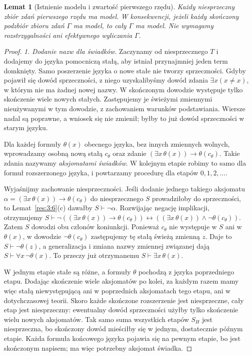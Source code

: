 \documentclass[11pt,a4paper]{article}
\numberwithin{equation}{section}
\theoremstyle{plain}
\newtheorem{lemat}[twierdzenie]{Lemat}
\theoremstyle{definition}
\theoremstyle{remark}
\begin{document}
\begin{lemat}[Istnienie modelu i zwartość pierwszego rzędu]\label{res:14:7}
Każdy niesprzeczny zbiór zdań pierwszego rzędu ma model. W konsekwencji, jeżeli każdy skończony podzbiór zbioru zdań $\Gamma$ ma model, to cały $\Gamma$ ma model. Nie wymagamy rozstrzygalności ani efektywnego wyliczania $\Gamma$.
\end{lemat}
\begin{proof}
\emph{1. Dodanie nazw dla świadków.} Zaczynamy od niesprzecznego $T$ i dodajemy do języka pomocniczą stałą, aby istniał przynajmniej jeden term domknięty. Samo poszerzenie języka o nowe stałe nie tworzy sprzeczności. Gdyby pojawił się dowód sprzeczności, z niego uzyskalibyśmy dowód zdania $\exists x(x\ne x)$, w którym nie ma żadnej nowej nazwy. W skończonym dowodzie występuje tylko skończenie wiele nowych stałych. Zastępujemy je świeżymi zmiennymi nieużywanymi w tym dowodzie, z zachowaniem warunków podstawiania. Wiersze nadal są poprawne, a wniosek się nie zmienił; byłby to już dowód sprzeczności w starym języku.

Dla każdej formuły $\theta(x)$ obecnego języka, bez innych zmiennych wolnych, wprowadzamy osobną nową stałą $c_\theta$ oraz zdanie $(\exists x\,\theta(x))\to\theta(c_\theta)$. Takie zdania nazywamy \emph{aksjomatami świadków}. W kolejnym etapie robimy to samo dla formuł rozszerzonego języka, i powtarzamy procedurę dla etapów $0,1,2,\ldots$.

Wyjaśnijmy zachowanie niesprzeczności. Jeśli dodanie jednego takiego aksjomatu $\alpha=(\exists x\,\theta(x))\to\theta(c_\theta)$ do niesprzecznego $S$ prowadziłoby do sprzeczności, to Lemat~\ref{res:3:6}(c) dawałby $S\vdash\neg\alpha$. Rozwijając negację implikacji, otrzymujemy $S\vdash\neg((\exists x\,\theta(x))\to\theta(c_\theta))\leftrightarrow((\exists x\,\theta(x))\land\neg\theta(c_\theta))$. Zatem $S$ dowodzi obu członów koniunkcji. Ponieważ $c_\theta$ nie występuje w $S$ ani w $\theta(x)$, w dowodzie $\neg\theta(c_\theta)$ zastępujemy tę stałą świeżą zmienną $z$. Daje to $S\vdash\neg\theta(z)$, a generalizacja i zmiana nazwy zmiennej związanej dają $S\vdash\forall x\,\neg\theta(x)$. To przeczy już otrzymanemu $S\vdash\exists x\,\theta(x)$.

W jednym etapie stałe są różne, a formuły $\theta$ pochodzą z języka poprzedniego etapu. Dodając skończenie wiele aksjomatów po kolei, za każdym razem mamy więc stałą niewystępującą ani w poprzednich aksjomatach tego etapu, ani w dotychczasowej teorii. Skoro każde skończone rozszerzenie jest niesprzeczne, cały etap jest niesprzeczny: ewentualny dowód sprzeczności użyłby tylko skończenie wielu nowych aksjomatów. Tak samo suma wszystkich etapów $S_H$ jest niesprzeczna, bo skończony dowód mieściłby się w jednym, dostatecznie późnym etapie. Każda formuła końcowego języka pojawia się na pewnym etapie, bo jest skończonym napisem; ma więc potrzebny aksjomat świadka.


\end{proof}
\end{document}
